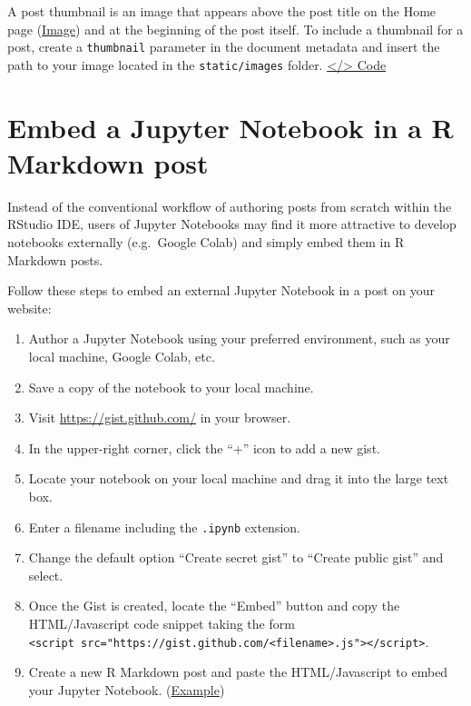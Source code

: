 \documentclass[
]{book}
\providecommand{\tightlist}{%
  \setlength{\itemsep}{0pt}\setlength{\parskip}{0pt}}
\begin{document}
A post thumbnail is an image that appears above the post title on the Home page (\href{https://i.imgur.com/ITLkYTP.png}{Image}) and at the beginning of the post itself. To include a thumbnail for a post, create a \texttt{thumbnail} parameter in the document metadata and insert the path to your image located in the \texttt{static/images} folder. \href{https://github.com/dannymorris/r4sites-anatole-custom/blob/master/content/english/post/2021-04-30-sample-post-using-python-in-r-markdown/index.en.Rmd\#L15}{\textless/\textgreater{} Code}

\hypertarget{embed-a-jupyter-notebook-in-a-r-markdown-post}{%
\section{Embed a Jupyter Notebook in a R Markdown post}\label{embed-a-jupyter-notebook-in-a-r-markdown-post}}

Instead of the conventional workflow of authoring posts from scratch within the RStudio IDE, users of Jupyter Notebooks may find it more attractive to develop notebooks externally (e.g.~Google Colab) and simply embed them in R Markdown posts.

Follow these steps to embed an external Jupyter Notebook in a post on your website:

\begin{enumerate}
\def\labelenumi{\arabic{enumi}.}
\tightlist
\item
  Author a Jupyter Notebook using your preferred environment, such as your local machine, Google Colab, etc.
\item
  Save a copy of the notebook to your local machine.
\item
  Visit \url{https://gist.github.com/} in your browser.
\item
  In the upper-right corner, click the ``+'' icon to add a new gist.
\item
  Locate your notebook on your local machine and drag it into the large text box.
\item
  Enter a filename including the \texttt{.ipynb} extension.
\item
  Change the default option ``Create secret gist'' to ``Create public gist'' and select.
\item
  Once the Gist is created, locate the ``Embed'' button and copy the HTML/Javascript code snippet taking the form \texttt{\textless{}script\ src="https://gist.github.com/\textless{}filename\textgreater{}.js"\textgreater{}\textless{}/script\textgreater{}}.
\item
  Create a new R Markdown post and paste the HTML/Javascript to embed your Jupyter Notebook. (\href{https://github.com/dannymorris/abndistro2/blob/master/content/post/2021-05-18-basic-usage-of-pyspark-and-spark-mllib-for-cluster-analysis/index.Rmd}{Example})
\end{enumerate}
\end{document}
